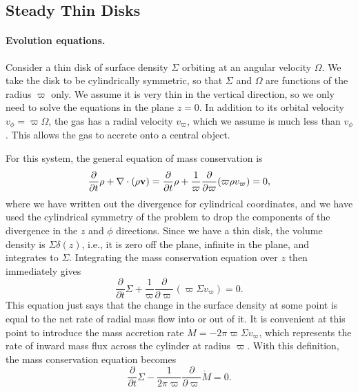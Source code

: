 \subsection{Steady Thin Disks}

\paragraph{Evolution equations.}

Consider a thin disk of surface density $\Sigma$ orbiting at an angular velocity $\Omega$. We take the disk to be cylindrically symmetric, so that $\Sigma$ and $\Omega$ are functions of the radius $\varpi$ only. We assume it is very thin in the vertical direction, so we only need to solve the equations in the plane $z=0$. In addition to its orbital velocity $v_{\phi}=\varpi\Omega$, the gas has a radial velocity $v_\varpi$, which we assume is much less than $v_{\phi}$. This allows the gas to accrete onto a central object.

For this system, the general equation of mass conservation is
\begin{equation}
\frac{\partial}{\partial t}\rho + \nabla\cdot(\rho \mathbf{v}) = \frac{\partial}{\partial t}\rho + \frac{1}{\varpi} \frac{\partial}{\partial \varpi}(\varpi \rho v_\varpi) = 0,
\end{equation}
where we have written out the divergence for cylindrical coordinates, and we have used the cylindrical symmetry of the problem to drop the components of the divergence in the $z$ and $\phi$ directions. Since we have a thin disk, the volume density is $\Sigma \delta(z)$, i.e., it is zero off the plane, infinite in the plane, and integrates to $\Sigma$. Integrating the mass conservation equation over $z$ then immediately gives
\begin{equation}
\frac{\partial}{\partial t}\Sigma + \frac{1}{\varpi} \frac{\partial}{\partial \varpi}(\varpi \Sigma v_\varpi) = 0.
\end{equation}
This equation just says that the change in the surface density at some point is equal to the net rate of radial mass flow into or out of it. It is convenient at this point to introduce the mass accretion rate $\dot{M}=-2\pi \varpi \Sigma v_\varpi$, which represents the rate of inward mass flux across the cylinder at radius $\varpi$. With this definition, the mass conservation equation becomes
\begin{equation}
\label{eq:continuity_disk}
\frac{\partial}{\partial t}\Sigma - \frac{1}{2\pi \varpi} \frac{\partial}{\partial \varpi}\dot{M} = 0.
\end{equation}

